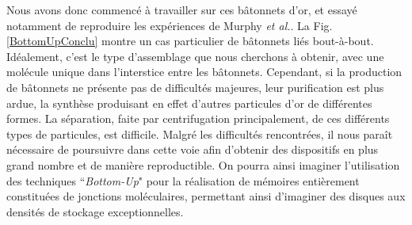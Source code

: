 Nous avons donc commencé à travailler sur ces bâtonnets d'or, et essayé notamment de reproduire les expériences de Murphy \textit{et al.}. La Fig.\ref{BottomUpConclu} montre un cas particulier de bâtonnets liés bout-à-bout. Idéalement, c'est le type d'assemblage que nous cherchons à obtenir, avec une molécule unique dans l'interstice entre les bâtonnets. Cependant, si la production de bâtonnets ne présente pas de difficultés majeures, leur purification est plus ardue, la synthèse produisant en effet d'autres particules d'or de différentes formes. La séparation, faite par centrifugation principalement, de ces différents types de particules, est difficile. Malgré les difficultés rencontrées, il nous paraît nécessaire de poursuivre dans cette voie afin d’obtenir des dispositifs en plus grand nombre et de manière reproductible. On pourra ainsi imaginer l’utilisation des techniques ``\textit{Bottom-Up}" pour la réalisation de mémoires entièrement constituées de jonctions moléculaires, permettant ainsi d’imaginer des disques aux densités de stockage exceptionnelles.

